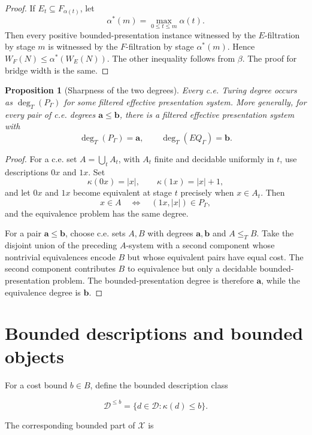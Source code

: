 \documentclass[11pt]{article}
\newtheorem{proposition}[theorem]{Proposition}
\begin{document}
\begin{proof}
If \(E_t\subseteq F_{\alpha(t)}\), let
\[
\alpha^*(m)=\max_{0\leq t\leq m}\alpha(t).
\]
Then every positive bounded-presentation instance witnessed by the \(E\)-filtration by stage \(m\) is witnessed by the \(F\)-filtration by stage \(\alpha^*(m)\).  Hence \(W_F(N)\leq\alpha^*(W_E(N))\).  The other inequality follows from \(\beta\).  The proof for bridge width is the same.
\end{proof}

\begin{proposition}[Sharpness of the two degrees]
Every c.e. Turing degree occurs as \(\deg_T(P_\Gamma)\) for some filtered effective presentation system.  More generally, for every pair of c.e. degrees \(\mathbf a\leq\mathbf b\), there is a filtered effective presentation system with
\[
\deg_T(P_\Gamma)=\mathbf a,
\qquad
\deg_T(EQ_\Gamma)=\mathbf b.
\]
\end{proposition}

\begin{proof}
For a c.e. set \(A=\bigcup_t A_t\), with \(A_t\) finite and decidable uniformly in \(t\), use descriptions \(0x\) and \(1x\).  Set
\[
\kappa(0x)=|x|,
\qquad
\kappa(1x)=|x|+1,
\]
and let \(0x\) and \(1x\) become equivalent at stage \(t\) precisely when \(x\in A_t\).  Then
\[
x\in A
\quad\Longleftrightarrow\quad
(1x,|x|)\in P_\Gamma,
\]
and the equivalence problem has the same degree.

For a pair \(\mathbf a\leq\mathbf b\), choose c.e. sets \(A,B\) with degrees \(\mathbf a,\mathbf b\) and \(A\leq_T B\).  Take the disjoint union of the preceding \(A\)-system with a second component whose nontrivial equivalences encode \(B\) but whose equivalent pairs have equal cost.  The second component contributes \(B\) to equivalence but only a decidable bounded-presentation problem.  The bounded-presentation degree is therefore \(\mathbf a\), while the equivalence degree is \(\mathbf b\).
\end{proof}


\section{Bounded descriptions and bounded objects}

For a cost bound \(b\in B\), define the bounded description class

\[
\mathcal D^{\leq b}=\{d\in\mathcal D:\kappa(d)\leq b\}.
\]

The corresponding bounded part of \(\mathcal X\) is
\end{document}
